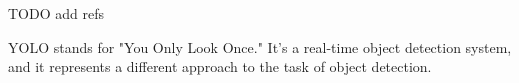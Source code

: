\documentclass[14pt,a4paper]{extarticle}
\newcounter{e}
\numberwithin{equation}{section}
\numberwithin{figure}{section}
\begin{document}
TODO add refs

YOLO stands for "You Only Look Once." It's a real-time object detection system, and it represents a different approach to the task of object detection.
\end{document}
